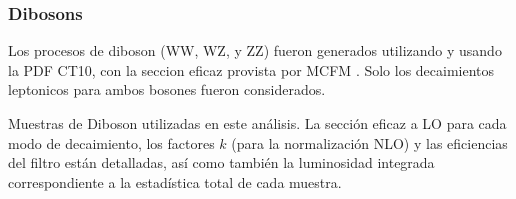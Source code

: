 \subsubsection{Dibosons}

Los procesos de diboson (WW, WZ, y ZZ) fueron generados utilizando
{\sherpa} y usando la PDF CT10, con la seccion eficaz provista por
MCFM \cite{Campbell:2011bn}. Solo los decaimientos leptonicos para
ambos bosones fueron considerados.

\begin{table}[ht!]
  \centering
  \caption{Muestras de Diboson utilizadas en este análisis.
    La sección eficaz a LO para cada modo de decaimiento, los factores $k$
    (para la normalización NLO) y las eficiencias del filtro están detalladas,
    así como también la luminosidad integrada correspondiente a la estadística
    total de cada muestra.}


\end{table}
